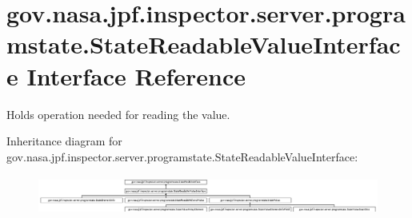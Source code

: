 \hypertarget{interfacegov_1_1nasa_1_1jpf_1_1inspector_1_1server_1_1programstate_1_1_state_readable_value_interface}{}\section{gov.\+nasa.\+jpf.\+inspector.\+server.\+programstate.\+State\+Readable\+Value\+Interface Interface Reference}
\label{interfacegov_1_1nasa_1_1jpf_1_1inspector_1_1server_1_1programstate_1_1_state_readable_value_interface}


Holds operation needed for reading the value.  


Inheritance diagram for gov.\+nasa.\+jpf.\+inspector.\+server.\+programstate.\+State\+Readable\+Value\+Interface\+:\begin{figure}[H]
\begin{center}
\leavevmode
\includegraphics[height=1.296296cm]{interfacegov_1_1nasa_1_1jpf_1_1inspector_1_1server_1_1programstate_1_1_state_readable_value_interface}
\end{center}
\end{figure}
